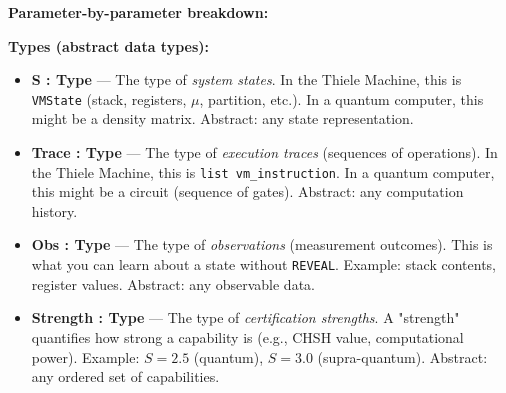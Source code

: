 \textbf{Parameter-by-parameter breakdown:}

\textbf{Types (abstract data types):}
\begin{itemize}
    \item \textbf{S : Type} — The type of \textit{system states}. In the Thiele Machine, this is \texttt{VMState} (stack, registers, $\mu$, partition, etc.). In a quantum computer, this might be a density matrix. Abstract: any state representation.
    
    \item \textbf{Trace : Type} — The type of \textit{execution traces} (sequences of operations). In the Thiele Machine, this is \texttt{list vm\_instruction}. In a quantum computer, this might be a circuit (sequence of gates). Abstract: any computation history.
    
    \item \textbf{Obs : Type} — The type of \textit{observations} (measurement outcomes). This is what you can learn about a state without \texttt{REVEAL}. Example: stack contents, register values. Abstract: any observable data.
    
    \item \textbf{Strength : Type} — The type of \textit{certification strengths}. A "strength" quantifies how strong a capability is (e.g., CHSH value, computational power). Example: $S = 2.5$ (quantum), $S = 3.0$ (supra-quantum). Abstract: any ordered set of capabilities.
\end{itemize}

